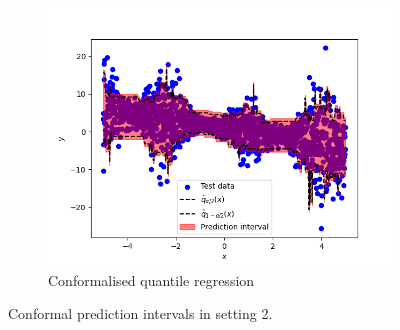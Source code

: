 \documentclass[11pt, titlepage]{article} %
\numberwithin{equation}{section}
\theoremstyle{definition}
\numberwithin{theorem}{section}
\numberwithin{lemma}{section}
\numberwithin{corollary}{section}
\numberwithin{proposition}{section}
\numberwithin{definition}{section}
\numberwithin{remark}{section}
\begin{document}
\begin{figure}[H]
\begin{subfigure}{0.49\textwidth}
    \includegraphics[width=\linewidth]{figures/2_4_heteroscedastic_CQR.png}    
    \caption{Conformalised quantile regression} \label{fig:2_4_heteroscedastic_CQR}
    \end{subfigure}
    \medskip
    \caption{Conformal prediction intervals in setting 2.}
\label{fig:2_4_heteroscedastic}
\end{figure}
\end{document}
